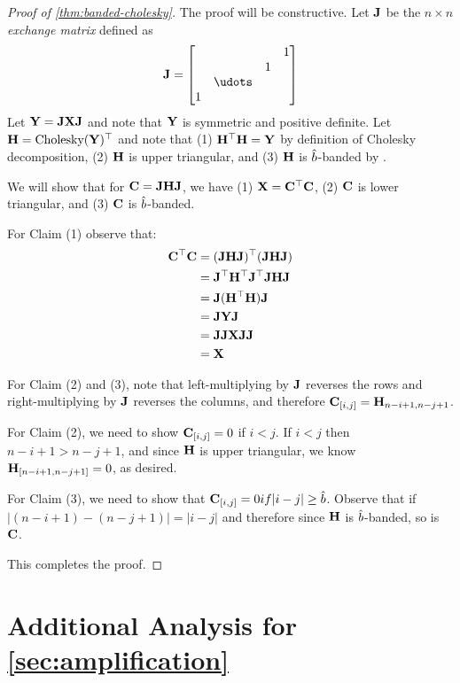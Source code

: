 \documentclass{article}
\begin{document}
\begin{proof}[Proof of \cref{thm:banded-cholesky}]
The proof will be constructive.  Let $\mathbf{J}$ be the $n \times n$ \emph{exchange matrix} defined as
$$
\bfJ = \begin{bmatrix}
& & & 1 \\
& & 1 & \\
& \udots & & \\
1 & & & \\
\end{bmatrix}
$$
Let $\mathbf{Y} = \mathbf{J} \mathbf{X} \mathbf{J}$ and note that $\mathbf{Y}$ is symmetric and positive definite.  Let $\mathbf{H} = \text{Cholesky}(\mathbf{Y})^\top$ and note that (1) $\mathbf{H}^\top \mathbf{H} = \mathbf{Y}$ by definition of Cholesky decomposition, (2) $\mathbf{H}$ is upper triangular, and (3) $\mathbf{H}$ is $\hat{b}$-banded by \citet{du2005factorizations}.  

We will show that for $\mathbf{C} = \mathbf{J} \mathbf{H} \mathbf{J}$, we have (1) $\mathbf{X} = \mathbf{C}^\top \mathbf{C}$, (2) $\mathbf{C}$ is lower triangular, and (3) $\mathbf{C}$ is $\hat{b}$-banded.

For Claim (1) observe that:
\begin{align*}
\mathbf{C}^\top \mathbf{C} &= (\mathbf{J} \mathbf{H} \mathbf{J})^\top (\mathbf{J} \mathbf{H} \mathbf{J}) \\
&= \mathbf{J}^\top \mathbf{H}^\top \mathbf{J}^\top \mathbf{J} \mathbf{H} \mathbf{J} \\
&= \mathbf{J} (\mathbf{H}^\top \mathbf{H}) \mathbf{J} \\
&= \mathbf{J} \mathbf{Y} \mathbf{J} \\
&= \mathbf{J} \mathbf{J} \mathbf{X} \mathbf{J} \mathbf{J} \\
&= \mathbf{X}
\end{align*}

For Claim (2) and (3), note that left-multiplying by $\mathbf{J}$ reverses the rows and right-multiplying by $\mathbf{J}$ reverses the columns, and therefore $\mathbf{C}_{[i,j]} = \mathbf{H}_{n-i+1,n-j+1}$.  

For Claim (2), we need to show $\mathbf{C}_{[i,j]} = 0$ if $i < j$.  If $i < j$ then $n-i+1 > n-j+1$, and since $\mathbf{H}$ is upper triangular, we know $\mathbf{H}_{[n-i+1,n-j+1]}=0$, as desired.

For Claim (3), we need to show that $\mathbf{C}_{[i,j]} =0 if | i - j | \geq \hat{b}$.  Observe that if $| (n-i+1) - (n-j+1) | = | i - j |$ and therefore since $\mathbf{H}$ is $\hat{b}$-banded, so is $\mathbf{C}$. 

This completes the proof.
\end{proof}


\section{Additional Analysis for \cref{sec:amplification}}\label{sec:app-amplification}
\end{document}
